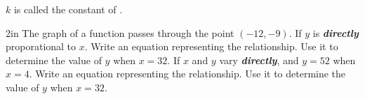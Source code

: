 \vspace{1em}
$k$ is called the constant of .



\begin{my2Problems}{2in}
        {
            The graph of a function passes through the point
            $(-12,-9)$.
            If $y$ is {\bfseries\itshape directly} proporational
            to $x$.
            Write an equation representing the relationship.
            Use it to determine the value of $y$ when $x=32$.
        }
        {
            If $x$ and $y$ vary {\bfseries\itshape directly},
            and $y=52$ when $x=4$.
            Write an equation representing the relationship.
            Use it to determine the value of $y$ when $x=32$.
        }
\end{my2Problems}
